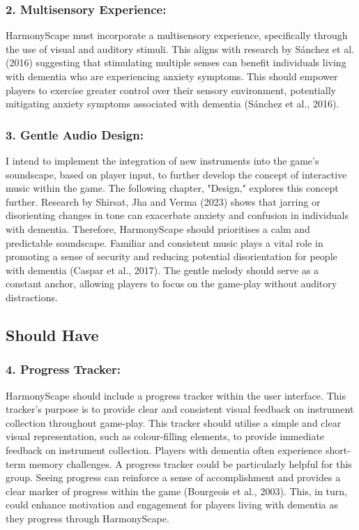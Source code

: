 \documentclass{l4proj}
\begin{document}
\subsubsection{2. Multisensory Experience:} HarmonyScape must incorporate a multisensory experience, specifically through the use of visual and auditory stimuli. This aligns with research by Sánchez et al. (2016) suggesting that stimulating multiple senses can benefit individuals living with dementia who are experiencing anxiety symptoms. This should empower players to exercise greater control over their sensory environment, potentially mitigating anxiety symptoms associated with dementia (Sánchez et al., 2016).

\subsubsection{3. Gentle Audio Design:} I intend to implement the integration of new instruments into the game's soundscape, based on player input, to further develop the concept of interactive music within the game. The following chapter, "Design," explores this concept further. Research by Shirsat, Jha and Verma (2023) shows that jarring or disorienting changes in tone can exacerbate anxiety and confusion in individuals with dementia. Therefore, HarmonyScape should prioritises a calm and predictable soundscape. Familiar and consistent music plays a vital role in promoting a sense of security and reducing potential disorientation for people with dementia (Caspar et al., 2017). The gentle melody should serve as a constant anchor, allowing players to focus on the game-play without auditory distractions.

\subsection{Should Have}
\subsubsection{4. Progress Tracker:} HarmonyScape should include a progress tracker within the user interface. This tracker's purpose is to provide clear and consistent visual feedback on instrument collection throughout game-play. This tracker should utilise a simple and clear visual representation, such as colour-filling elements, to provide immediate feedback on instrument collection. Players with dementia often experience short-term memory challenges. A progress tracker could be particularly helpful for this group. Seeing progress can reinforce a sense of accomplishment and provides a clear marker of progress within the game (Bourgeois et al., 2003). This, in turn, could enhance motivation and engagement for players living with dementia as they progress through HarmonyScape.
\end{document}
